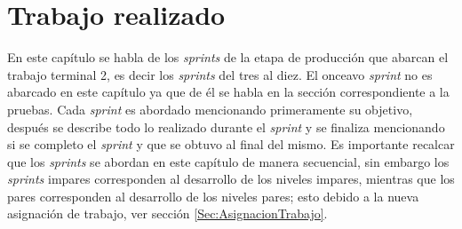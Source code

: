 \chapter{Trabajo realizado} \label{TrabajoTT2}
En este capítulo se habla de los \textit{sprints} de la etapa de producción que
abarcan el trabajo terminal 2, es decir los \textit{sprints} del tres al diez. El
onceavo \textit{sprint} no es abarcado en este capítulo ya que de él se habla en la
sección correspondiente a la pruebas. Cada \textit{sprint} es abordado mencionando
primeramente su objetivo, después se describe todo lo realizado durante el
\textit{sprint} y se finaliza mencionando si se completo el \textit{sprint} y que
se obtuvo al final del mismo. Es importante recalcar que los \textit{sprints} se
abordan en este capítulo de manera secuencial, sin embargo los \textit{sprints}
impares corresponden al desarrollo de los niveles impares, mientras que los pares
corresponden al desarrollo de los niveles pares; esto debido a la nueva asignación
de trabajo, ver sección \ref{Sec:AsignacionTrabajo}.

%











